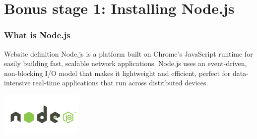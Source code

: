 \section{Bonus stage 1: Installing Node.js}

\begin{frame}[fragile]
\end{frame}

\begin{frame}[fragile]
  \frametitle{What is Node.js}
  \begin{block}{Website definition}
    Node.js is a platform built on Chrome's JavaScript runtime for easily building fast, scalable network applications. Node.js uses an event-driven, non-blocking I/O model that makes it lightweight and efficient, perfect for data-intensive real-time applications that run across distributed devices.
  \end{block}

  \begin{center}
    \includegraphics[width=150px]{images/nodejs.png}
  \end{center}
\end{frame}
